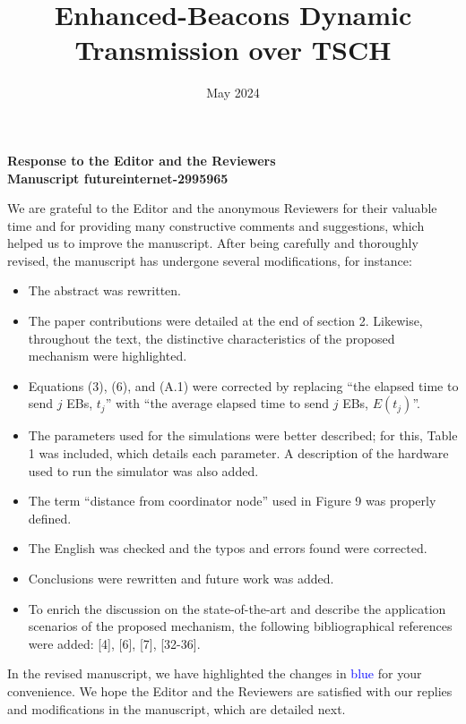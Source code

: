 \documentclass{article}
\title{Enhanced-Beacons Dynamic Transmission over TSCH} %
\date{May 2024}
\newcommand{\textchange}[1]{\textcolor{blue}{#1}}
\begin{document}
\maketitle
\begin{center}
\textbf{Response to the  Editor and the Reviewers \\ \medskip Manuscript futureinternet-2995965 \\ \medskip} 

\end{center}

We are grateful to the Editor and the anonymous Reviewers for their valuable time and for providing many constructive comments and suggestions, which helped us to improve the manuscript. After being carefully and thoroughly revised, the manuscript has undergone several modifications, for instance:

\begin{itemize}
     \item The abstract was rewritten.
     \item The paper contributions were detailed at the end of section 2. Likewise, throughout the text, the distinctive characteristics of the proposed mechanism were highlighted.
     \item Equations (3), (6), and (A.1) were corrected by replacing ``the elapsed time to send $j$ EBs, $t_j$'' with ``the average elapsed time to send $j$ EBs, $E(t_j)$''.
     \item The parameters used for the simulations were better described; for this, Table 1 was included, which details each parameter. A description of the hardware used to run the simulator was also added.
     \item The term ``distance from coordinator node'' used in Figure 9 was properly defined.
     \item The English was checked and the typos and errors found were corrected.
     \item Conclusions were rewritten and future work was added.
     \item To enrich the discussion on the state-of-the-art and describe the application scenarios of the proposed mechanism, the following bibliographical references were added: [4], [6], [7], [32-36].
\end{itemize}

In the revised manuscript, we have highlighted the changes in \textchange{blue} for your convenience. We hope the Editor and the Reviewers are satisfied with our replies and modifications in the manuscript, which are detailed next.
\end{document}
